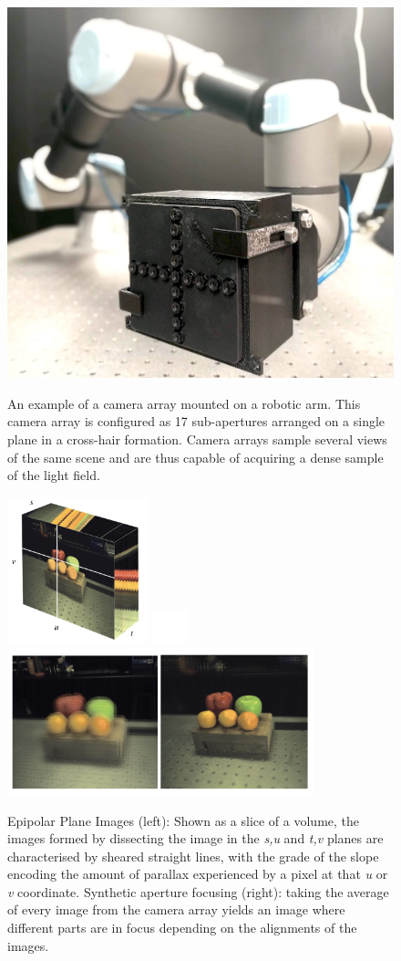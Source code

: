 \documentclass[openany]{book}
\begin{document}
\begin{figure}[tbp]
    \centering
    \includegraphics[width=4.5in]{images/robotcamera.jpg}
    \caption{An example of a camera array mounted on a robotic arm. This camera array is configured as 17 sub-apertures arranged on a single plane in a cross-hair formation. Camera arrays sample several views of the same scene and are thus capable of acquiring a dense sample of the light field.}
    \label{cameraarray}
    \vspace{1cm}
    \includegraphics[width=1.6in]{images/epipolarimage.png}
    \includegraphics[width=0.4in]{images/blank.png}
    \includegraphics[width=3.5in]{images/fruitfocus.png}
    \caption{Epipolar Plane Images (left): Shown as a slice of a volume, the images formed by dissecting the image in the \textit{s,u} and \textit{t,v} planes are characterised by sheared straight lines, with the grade of the slope encoding the amount of parallax experienced by a pixel at that \textit{u} or \textit{v} coordinate. Synthetic aperture focusing (right): taking the average of every image from the camera array yields an image where different parts are in focus depending on the alignments of the images.}
    \label{epiplaneimg}
\end{figure}
\end{document}
